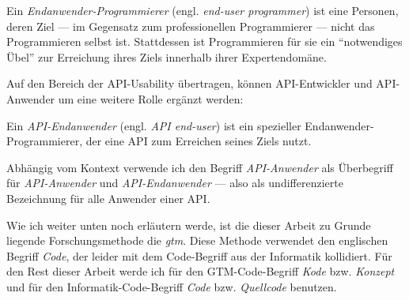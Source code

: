 \begin{description}
  \item Ein \textit{Endanwender-Programmierer} (engl. \textit{end-user programmer}) ist eine Personen, deren Ziel --- im Gegensatz zum professionellen Programmierer --- nicht das Programmieren selbst ist. Stattdessen ist Programmieren für sie ein ``notwendiges Übel'' zur Erreichung ihres Ziels innerhalb ihrer Expertendomäne.
\end{description}

\bigskip

Auf den Bereich der API-Usability übertragen, können API-Entwickler und API-Anwender um eine weitere Rolle ergänzt werden:

\begin{description}
  \item Ein \textit{API-Endanwender} (engl. \textit{API end-user}) ist ein spezieller Endanwender-Programmierer, der eine API zum Erreichen seines Ziels nutzt.
\end{description}

Abhängig vom Kontext verwende ich den Begriff \textit{API-Anwender} als Überbegriff für \textit{API-Anwender} und \textit{API-Endanwender} --- also als undifferenzierte Bezeichnung für alle Anwender einer API.

\bigskip

Wie ich weiter unten noch erläutern werde, ist die dieser Arbeit zu Grunde liegende Forschungsmethode die \textit{\gls{gtm}}. Diese Methode verwendet den englischen Begriff \textit{Code}, der leider mit dem Code-Begriff aus der Informatik kollidiert. Für den Rest dieser Arbeit werde ich für den GTM-Code-Begriff \textit{Kode} bzw. \textit{Konzept} und für den Informatik-Code-Begriff \textit{Code} bzw. \textit{Quellcode} benutzen.

